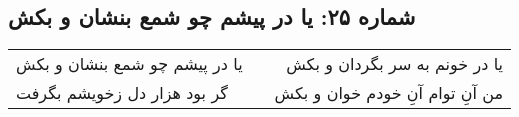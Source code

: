 \begin{center}
\section*{شماره ۲۵: یا در پیشم چو شمع بنشان و بکش}
\label{sec:025}
\begin{longtable}{l p{0.5cm} r}
یا در پیشم چو شمع بنشان و بکش
&&
یا در خونم به سر بگردان و بکش
\\
گر بود هزار دل زخویشم بگرفت
&&
من آنِ توام آنِ خودم خوان و بکش
\\
\end{longtable}
\end{center}
